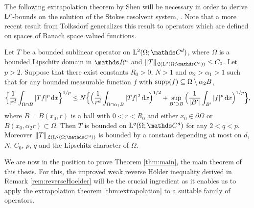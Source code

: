 
The following extrapolation theorem by Shen will be necessary in order to derive $\mathrm{L}^p$-bounds on the solution of the Stokes resolvent system, \cite[Thm. 3.3]{shenExtra}.
Note that a more recent result from Tolksdorf \cite{tolksdorf2017} generalizes this result to operators which are defined on spaces of Banach space valued functions.

\begin{thm}
  \label{thm:extrapolation}
  Let $T$ be a bounded sublinear operator on $\Ell^2(\Omega; \C^d)$, where $\Omega$ is a bounded Lipschitz domain in $\R^n$ and $\|T\|_{\Li(\Ell^2(\Omega; \C^d))} \leq C_0$.
  Let $p > 2$.
  Suppose that there exist constants $R_0 > 0$, $N > 1$ and $\alpha_2 > \alpha_1 > 1$ such that for any bounded measurable function $f$ with $\operatorname{supp}(f) \subseteq \Omega \setminus \alpha_2 B$,
  \begin{align*}
    \Big\{ \frac{1}{r^d} \int_{\Omega \cap B} |Tf|^p \, {\operatorname{d}\!{x}} \Big\}^{1/p}
    \leq N \Big\{ \Big( \frac{1}{r^d} \int_{\Omega \cap \alpha_1 B} |T f|^2 \, {\operatorname{d}\!{x}} \Big)^{1/2} + \sup_{B' \supset B} \Big( \frac{1}{|B'|} \int_{B'} |f|^p \, {\operatorname{d}\!{x}} \Big)^{1/p} \Big\},
  \end{align*}
  where $B = B(x_0, r)$ is a ball with $0 < r < R_0$ and either $x_0 \in \partial\Omega$ or $B(x_0, \alpha_2 r) \subset \Omega$.
  Then $T$ is bounded on $\Ell^q(\Omega; \C^d)$ for any $2 < q < p$.
  Moreover $\|T\|_{\Li(\Ell^q(\Omega; \C^d))}$ is bounded by a constant depending at most on $d$, $N$, $C_0$, $p$, $q$ and the Lipschitz character of $\Omega$.
\end{thm}

We are now in the position to prove Theorem \ref{thm:main}, the main theorem of this thesis. For this, the improved weak reverse H\"older inequality derived in Remark \ref{rem:reverseHoelder} will be the crucial ingredient as it enables us to apply the extrapolation theorem \ref{thm:extrapolation} to a suitable family of operators.

